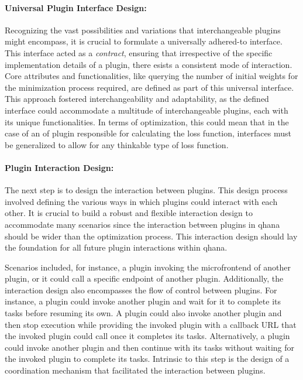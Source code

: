 \documentclass[
  a4paper,  %
  twoside,  %
  bibliography=totoc,
  headsepline,
  cleardoublepage=empty,
  parskip=half,
  draft=false
]{scrbook}
\begin{document}
\paragraph{Universal Plugin Interface Design:}
Recognizing the vast possibilities and variations that interchangeable plugins might encompass, it is crucial to formulate a universally adhered-to interface.
This interface acted as a \emph{contract}, ensuring that irrespective of the specific implementation details of a plugin, there esists a consistent mode of interaction.
Core attributes and functionalities, like querying the number of initial weights for the minimization process required, are defined as part of this universal interface.
This approach fostered interchangeability and adaptability, as the defined interface could accommodate a multitude of interchangeable plugins, each with its unique functionalities.
In terms of optimization, this could mean that in the case of an \gls{of} plugin responsible for calculating the loss function, interfaces must be generalized to allow for any thinkable type of loss function.


\paragraph{Plugin Interaction Design:}
The next step is to design the interaction between plugins.
This design process involved defining the various ways in which plugins could interact with each other.
It is crucial to build a robust and flexible interaction design to accommodate many scenarios since the interaction between plugins in \gls{qhana} should be wider than the optimization process.
This interaction design should lay the foundation for all future plugin interactions within \gls{qhana}.

Scenarios included, for instance, a plugin invoking the microfrontend of another plugin, or it could call a specific endpoint of another plugin.
Additionally, the interaction design also encompasses the flow of control between plugins.
For instance, a plugin could invoke another plugin and wait for it to complete its tasks before resuming its own.
A plugin could also invoke another plugin and then stop execution while providing the invoked plugin with a callback URL that the invoked plugin could call once it completes its tasks.
Alternatively, a plugin could invoke another plugin and then continue with its tasks without waiting for the invoked plugin to complete its tasks.
Intrinsic to this step is the design of a coordination mechanism that facilitated the interaction between plugins.
\end{document}
